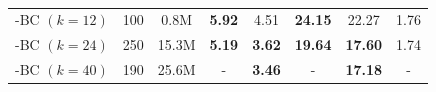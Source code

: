 \begin{table}[]
{\begin{tabular}{l|cc|cc|cc|c}
\methodnameshort{}-BC $(k=12)$ & 100 & 0.8M & \textbf{5.92} & 4.51 & \textbf{24.15} & 22.27 & 1.76 \\
\methodnameshort{}-BC $(k=24)$ & 250 & 15.3M & {\color{blue}\textbf{5.19}} & \textbf{3.62} & {\color{blue}\textbf{19.64}} & \textbf{17.60} & 1.74 \\
\methodnameshort{}-BC $(k=40)$ & 190 & 25.6M & - & {\color{blue}\textbf{3.46}} & - & {\color{blue}\textbf{17.18}} & - \\ \hline
\end{tabular}%
}
\vspace{0.5ex}
\caption{\resultcaption}
\label{my-label}
\vspace{-1ex}
\end{table} 